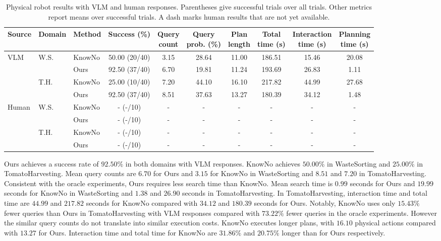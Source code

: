\begin{table}[t]
\centering
\caption{Physical robot results with VLM and human responses. Parentheses give successful trials over all trials. Other metrics report means over successful trials. A dash marks human results that are not yet available.}
\label{tab:physical_robot_results}
\small
\setlength{\tabcolsep}{2.5pt}
\begin{tabular*}{\textwidth}{@{\extracolsep{\fill}}lllccccccc}
\toprule
Source & Domain & Method & Success (\%) & \shortstack{Query\\count} & \shortstack{Query\\prob. (\%)} & \shortstack{Plan\\length} & \shortstack{Total\\time (s)} & \shortstack{Interaction\\time (s)} & \shortstack{Planning\\time (s)} \\
\midrule
VLM & W.S. & KnowNo & 50.00 (20/40) & 3.15 & 28.64 & 11.00 & 186.51 & 15.46 & 20.08 \\
 &  & Ours & 92.50 (37/40) & 6.70 & 19.81 & 11.24 & 193.69 & 26.83 & 1.11 \\
\addlinespace
 & T.H. & KnowNo & 25.00 (10/40) & 7.20 & 44.10 & 16.10 & 217.82 & 44.99 & 27.68 \\
 &  & Ours & 92.50 (37/40) & 8.51 & 37.63 & 13.27 & 180.39 & 34.12 & 1.48 \\
\midrule
Human & W.S. & KnowNo & - (-/10) & - & - & - & - & - & - \\
 &  & Ours & - (-/10) & - & - & - & - & - & - \\
\addlinespace
 & T.H. & KnowNo & - (-/10) & - & - & - & - & - & - \\
 &  & Ours & - (-/10) & - & - & - & - & - & - \\
\bottomrule
\end{tabular*}
\end{table}

Ours achieves a success rate of $92.50\%$ in both domains with VLM responses. KnowNo achieves $50.00\%$ in WasteSorting and $25.00\%$ in TomatoHarvesting. Mean query counts are $6.70$ for Ours and $3.15$ for KnowNo in WasteSorting and $8.51$ and $7.20$ in TomatoHarvesting. Consistent with the oracle experiments, Ours requires less search time than KnowNo. Mean search time is $0.99$ seconds for Ours and $19.99$ seconds for KnowNo in WasteSorting and $1.38$ and $26.90$ seconds in TomatoHarvesting. In TomatoHarvesting, interaction time and total time are $44.99$ and $217.82$ seconds for KnowNo compared with $34.12$ and $180.39$ seconds for Ours. Notably, KnowNo uses only $15.43\%$ fewer queries than Ours in TomatoHarvesting with VLM responses compared with $73.22\%$ fewer queries in the oracle experiments. However the similar query counts do not translate into similar execution costs. KnowNo executes longer plans, with $16.10$ physical actions compared with $13.27$ for Ours. Interaction time and total time for KnowNo are $31.86\%$ and $20.75\%$ longer than for Ours respectively.

